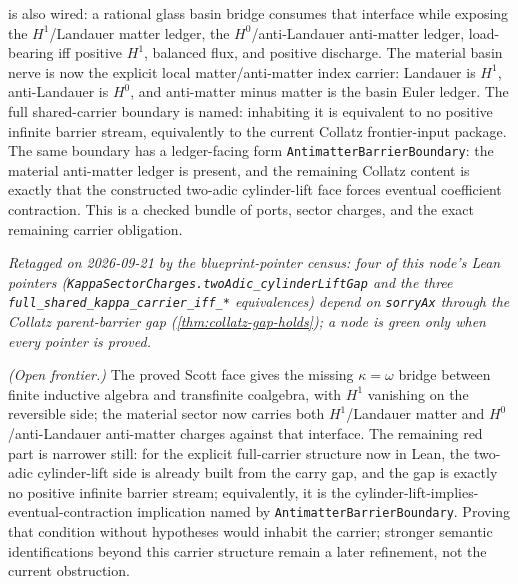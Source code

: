 \begin{theorem}
is also wired: a rational glass basin bridge consumes that interface while
exposing the \(H^1\)/Landauer matter ledger, the \(H^0\)/anti-Landauer
anti-matter ledger, load-bearing iff positive \(H^1\), balanced flux, and
positive discharge.  The material basin nerve is now the explicit local
matter/anti-matter index carrier: Landauer is \(H^1\), anti-Landauer is
\(H^0\), and anti-matter minus matter is the basin Euler ledger.  The full
shared-carrier boundary is named: inhabiting it is equivalent to no positive
infinite barrier stream, equivalently to the current Collatz frontier-input
package.  The same boundary has a ledger-facing form
\texttt{AntimatterBarrierBoundary}: the material anti-matter ledger is present,
and the remaining Collatz content is exactly that the constructed two-adic
cylinder-lift face forces eventual coefficient contraction.  This is a checked
bundle of ports, sector charges, and the exact remaining carrier obligation.

\emph{Retagged \notready{} on 2026-09-21 by the blueprint-pointer census: four of this node's Lean pointers (\texttt{KappaSectorCharges.twoAdic\_cylinderLiftGap} and the three \texttt{full\_shared\_kappa\_carrier\_iff\_*} equivalences) depend on \texttt{sorryAx} through the Collatz parent-barrier gap (\cref{thm:collatz-gap-holds}); a node is green only when every pointer is proved.}
\end{theorem}

\begin{theorem}\label{thm:landauer-collatz-zeta-kappa-synthesis}\notready{}
\emph{(Open frontier.)} The proved Scott face gives the missing
\(\kappa=\omega\) bridge between finite inductive algebra and transfinite
coalgebra, with \(H^1\) vanishing on the reversible side; the material sector
now carries both \(H^1\)/Landauer matter and \(H^0\)/anti-Landauer anti-matter
charges against that interface.  The remaining red part is narrower still:
for the explicit full-carrier structure now in Lean, the two-adic cylinder-lift
side is already built from the carry gap, and the gap is exactly no positive
infinite barrier stream; equivalently, it is the cylinder-lift-implies-
eventual-contraction implication named by \texttt{AntimatterBarrierBoundary}.
Proving that condition without hypotheses would inhabit the carrier; stronger
semantic identifications beyond this carrier structure remain a later
refinement, not the current obstruction.
\end{theorem}

